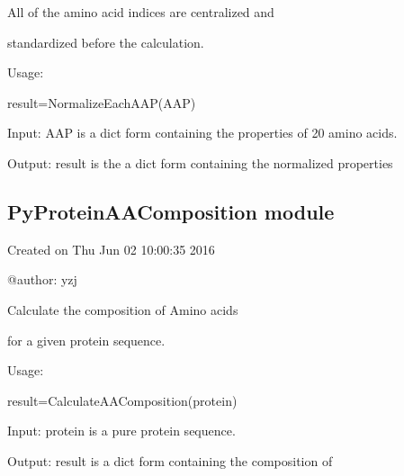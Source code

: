 \documentclass[letterpaper,10pt,english]{sphinxmanual}
\begin{document}

\begin{fulllineitems}
\label{reference/PseudoAAC:PseudoAAC.NormalizeEachAAP}
All of the amino acid indices are centralized and

standardized before the calculation.

Usage:

result=NormalizeEachAAP(AAP)

Input: AAP is a dict form containing the properties of 20 amino acids.

Output: result is the a dict form containing the normalized properties

\end{fulllineitems}



\subsection{PyProteinAAComposition module}
\label{reference/PyProteinAAComposition::doc}\label{reference/PyProteinAAComposition:pyproteinaacomposition-module}\label{reference/PyProteinAAComposition:module-PyProteinAAComposition}
Created on Thu Jun 02 10:00:35 2016

@author: yzj

\begin{fulllineitems}
\label{reference/PyProteinAAComposition:PyProteinAAComposition.CalculateAAComposition}
Calculate the composition of Amino acids

for a given protein sequence.

Usage:

result=CalculateAAComposition(protein)

Input: protein is a pure protein sequence.

Output: result is a dict form containing the composition of

\end{fulllineitems}

\end{document}
